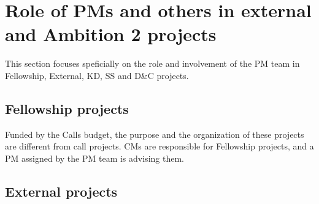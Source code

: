 \section{Role of PMs and others in external and Ambition 2 projects}
\label{app:pm-role}

This section focuses speficially on the role and involvement of the PM team in Fellowship,
External, KD, SS and D\&C projects.


\subsection{Fellowship projects}
Funded by the Calls budget, the purpose and the organization of these projects are different from call projects. CMs are
responsible for Fellowship projects, and a PM assigned by the PM team is advising them.

\subsection{External projects}

